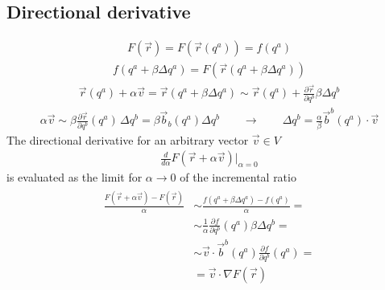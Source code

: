 \documentclass[letterpaper,10pt,english]{jupyterBook}
\begin{document}
\subsection{Directional derivative}
\label{\detokenize{ch/tensor-algebra-calculus/calculus-euclidean:directional-derivative}}\label{\detokenize{ch/tensor-algebra-calculus/calculus-euclidean:tensor-calculus-differential-operators-directional-derivative}}\begin{equation*}
\begin{split}F(\vec{r}) = F\left(\vec{r}\left(q^a\right)\right) = f(q^a)\end{split}
\end{equation*}\begin{equation*}
\begin{split}f(q^a + \beta \Delta q^a) = F(\vec{r}(q^a + \beta \Delta q^a))\end{split}
\end{equation*}\begin{equation*}
\begin{split}\vec{r}(q^a) + \alpha \vec{v} = \vec{r}(q^a + \beta \Delta q^a) \sim \vec{r}(q^a) + \frac{\partial \vec{r}}{\partial q^b} \beta \Delta q^b \end{split}
\end{equation*}\begin{equation*}
\begin{split}\alpha \vec{v} \sim \beta \frac{\partial \vec{r}}{\partial q^b}(q^a) \, \Delta q^b = \beta \vec{b}_b(q^a) \Delta q^b
\qquad \rightarrow \qquad \Delta q^b = \frac{\alpha}{\beta} \vec{b}^b(q^a) \cdot \vec{v} \end{split}
\end{equation*}
\sphinxAtStartPar
The directional derivative for an arbitrary vector \(\vec{v} \in V\)
\begin{equation*}
\begin{split}\frac{d}{d \alpha} F(\vec{r} + \alpha \vec{v})\bigg|_{\alpha = 0}\end{split}
\end{equation*}
\sphinxAtStartPar
is evaluated as the limit for \(\alpha \rightarrow 0\) of the incremental ratio
\begin{equation*}
\begin{split}\begin{aligned}
 \frac{F(\vec{r} + \alpha \vec{v}) - F(\vec{r})}{\alpha} 
 & \sim \frac{f(q^a + \beta \Delta q^a) - f(q^a)}{\alpha} = \\ 
 & \sim \frac{1}{\alpha} \frac{\partial f}{\partial q^b}(q^a) \beta \Delta q^b = \\
 & \sim \vec{v} \cdot \vec{b}^b(q^a) \frac{\partial f}{\partial q^b}(q^a) = \\
 & = \vec{v} \cdot \nabla F(\vec{r})
\end{aligned}\end{split}
\end{equation*}
\end{document}
